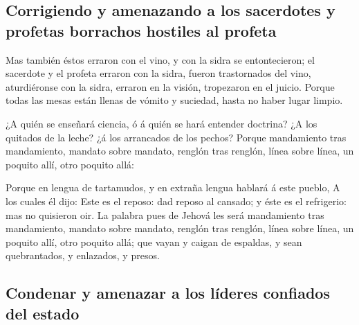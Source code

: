 \hypertarget{corrigiendo-y-amenazando-a-los-sacerdotes-y-profetas-borrachos-hostiles-al-profeta}{%
\subsection{Corrigiendo y amenazando a los sacerdotes y profetas
borrachos hostiles al
profeta}\label{corrigiendo-y-amenazando-a-los-sacerdotes-y-profetas-borrachos-hostiles-al-profeta}}

 Mas también éstos erraron con el vino, y con la sidra se
entontecieron; el sacerdote y el profeta erraron con la sidra, fueron
trastornados del vino, aturdiéronse con la sidra, erraron en la visión,
tropezaron en el juicio.  Porque todas las mesas están
llenas de vómito y suciedad, hasta no haber lugar limpio.

 ¿A quién se enseñará ciencia, ó á quién se hará entender
doctrina? ¿A los quitados de la leche? ¿á los arrancados de los pechos?
 Porque mandamiento tras mandamiento, mandato sobre
mandato, renglón tras renglón, línea sobre línea, un poquito allí, otro
poquito allá:

 Porque en lengua de tartamudos, y en extraña lengua
hablará á este pueblo,  A los cuales él dijo: Este es el
reposo: dad reposo al cansado; y éste es el refrigerio: mas no quisieron
oir.  La palabra pues de Jehová les será mandamiento tras
mandamiento, mandato sobre mandato, renglón tras renglón, línea sobre
línea, un poquito allí, otro poquito allá; que vayan y caigan de
espaldas, y sean quebrantados, y enlazados, y presos.

\hypertarget{condenar-y-amenazar-a-los-luxedderes-confiados-del-estado}{%
\subsection{Condenar y amenazar a los líderes confiados del
estado}\label{condenar-y-amenazar-a-los-luxedderes-confiados-del-estado}}

